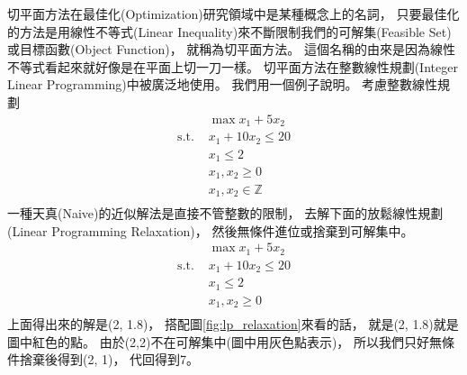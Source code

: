   切平面方法在最佳化(Optimization)研究領域中是某種概念上的名詞，
  只要最佳化的方法是用線性不等式(Linear Inequality)來不斷限制我們的可解集(Feasible Set)或目標函數(Object Function)，
  就稱為切平面方法。
  這個名稱的由來是因為線性不等式看起來就好像是在平面上切一刀一樣。
  切平面方法在整數線性規劃(Integer Linear Programming)中被廣泛地使用。
  我們用一個例子說明。
  考慮整數線性規劃
  \begin{equation}
    \begin{split}
      &\max x_1 + 5 x_2 \\
      \text{s.t. } &x_1 + 10 x_2 \leq 20 \\
      &x_1 \leq 2 \\
      &x_1, x_2 \geq 0 \\
      &x_1, x_2 \in \mathbb{Z} \\
    \end{split}
  \end{equation}
  一種天真(Naive)的近似解法是直接不管整數的限制，
  去解下面的放鬆線性規劃(Linear Programming Relaxation)，
  然後無條件進位或捨棄到可解集中。
  \begin{equation}
    \begin{split}
      &\max x_1 + 5 x_2 \\
      \text{s.t. } &x_1 + 10 x_2 \leq 20 \\
      &x_1 \leq 2 \\
      &x_1, x_2 \geq 0 \\
    \end{split}
  \end{equation}
  上面得出來的解是(2, 1.8)，
  搭配圖\ref{fig:lp_relaxation}來看的話，
  就是(2, 1.8)就是圖中紅色的點。
  由於(2,2)不在可解集中(圖中用灰色點表示)，
  所以我們只好無條件捨棄後得到(2, 1)，
  代回得到7。

